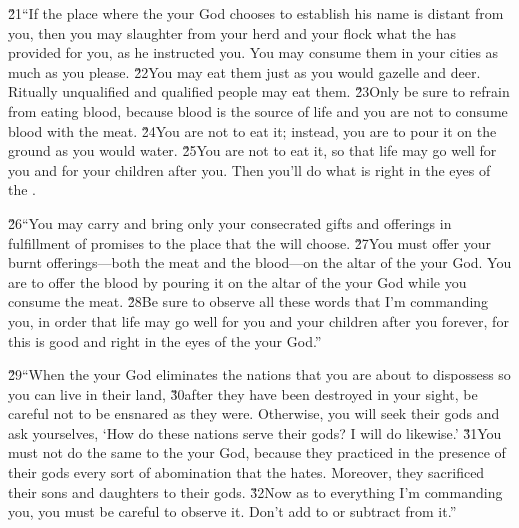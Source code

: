 \v{21}``If the place where the  your God chooses to establish his name is distant from you, then you may slaughter from your herd and your flock what the  has provided for you, as he instructed you. You may consume them in your cities as much as you please. \v{22}You may eat them just as you would gazelle and deer. Ritually unqualified and qualified people may eat them. \v{23}Only be sure to refrain from eating blood, because blood is the source of life and you are not to consume blood with the meat. \v{24}You are not to eat it; instead, you are to pour it on the ground as you would water. \v{25}You are not to eat it, so that life may go well for you and for your children after you. Then you'll do what is right in the eyes of the .

\v{26}``You may carry and bring only your consecrated gifts and offerings in fulfillment of promises to the place that the  will choose. \v{27}You must offer your burnt offerings---both the meat and the blood---on the altar of the  your God. You are to offer the blood by pouring it on the altar of the  your God while you consume the meat. \v{28}Be sure to observe all these words that I'm commanding you, in order that life may go well for you and your children after you forever, for this is good and right in the eyes of the  your God.''

\v{29}``When the  your God eliminates the nations that you are about to dispossess so you can live in their land, \v{30}after they have been destroyed in your sight, be careful not to be ensnared as they were. Otherwise, you will seek their gods and ask yourselves, `How do these nations serve their gods? I will do likewise.' \v{31}You must not do the same to the  your God, because they practiced in the presence of their gods every sort of abomination that the  hates. Moreover, they sacrificed their sons and daughters to their gods. \v{32}Now as to everything I'm commanding you, you must be careful to observe it. Don't add to or subtract from it.''

